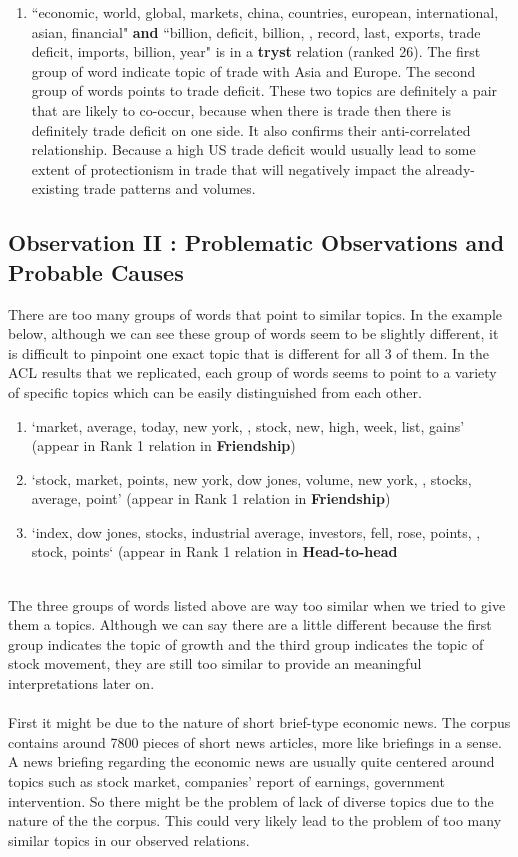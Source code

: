 \documentclass[11pt,a4paper]{article}
\newcommand\boldfriend[1]{\textcolor{green(html/cssgreen)}{\textbf{#1}}}
\newcommand\boldhead[1]{\textcolor{red-brown}{\textbf{#1}}}
\newcommand\boldtryst[1]{\textcolor{pinksherbet}{\textbf{#1}}}
\begin{document}
\begin{enumerate}
    \item ``economic, world, global, markets, china, countries, european, international, asian, financial"
    \textbf{and} 
    ``billion, deficit, billion, , record, last, exports, trade deficit, imports, billion, year" is in a \boldtryst{tryst} relation (ranked 26). The first group of word indicate topic of trade with Asia and Europe. The second group of words points to trade deficit. These two topics are definitely a pair that are likely to co-occur, because when there is trade then there is definitely trade deficit on one side. It also confirms their anti-correlated relationship. Because a high US trade deficit would usually lead to some extent of protectionism in trade that will negatively impact the already-existing trade patterns and volumes. 

\end{enumerate}


\subsection{Observation II : Problematic Observations and Probable Causes} 
There are too many groups of words that point to similar topics. In the example below, although we can see these group of words seem to be slightly different, it is difficult to pinpoint one exact topic that is different for all 3 of them. In the ACL results that we replicated, each group of words seems to point to a  variety of specific topics which can be easily distinguished from each other. 

\begin{enumerate}
    \item `market, average, today, new york, , stock, new, high, week, list, gains' (appear in Rank 1 relation in \boldfriend{Friendship})
    \item `stock, market, points, new york, dow jones, volume, new york, , stocks, average, point' (appear in Rank 1 relation in \boldfriend{Friendship})
    \item `index, dow jones, stocks, industrial average, investors, fell, rose, points, , stock, points` (appear in Rank 1 relation in \boldhead{Head-to-head}
\end{enumerate}
\\ 
The three groups of words listed above are way too similar when we tried to give them a topics. Although we can say there are a little different because the first group indicates the topic of growth and the third group indicates the topic of stock movement, they are still too similar to provide an meaningful interpretations later on. \\ \\
First it might be due to the nature of short brief-type economic news. The corpus contains around 7800 pieces of short news articles, more like briefings in a sense. A news briefing regarding the economic news are usually quite centered around topics such as stock market, companies' report of earnings, government intervention. So there might be the problem of lack of diverse topics due to the nature of the the corpus. This could very likely lead to the problem of too many similar topics in our observed relations. 
\end{document}
